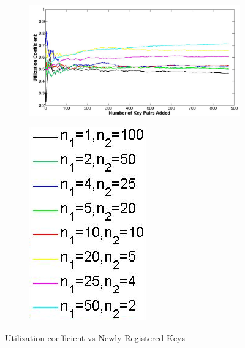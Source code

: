 \begin{figure}[!t]
\captionsetup{font=scriptsize}
\centering
\begin{subfigure}{0.5\textwidth}
\captionsetup{font=scriptsize}
\centering
\includegraphics[scale=0.22]{Figs/UtilizationPlot.png}
\end{subfigure}%
\begin{subfigure}{0.5\textwidth}
\captionsetup{font=scriptsize}
\centering
\hspace*{3.13 cm}
\includegraphics[scale=0.3]{Figs/Legend1.png}
\end{subfigure}
\caption{Utilization coefficient vs Newly Registered Keys}
\label{fig:util}
\end{figure}

